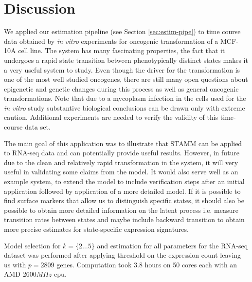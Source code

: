 \section{Discussion}
\label{sec:discussion-onco}

We applied our estimation pipeline (see Section \ref{sec:estim-pipe}) to time course data obtained by {\it in vitro} experiments for oncogenic transformation of a MCF-10A cell line. The system has many fascinating properties, the fact that it undergoes a rapid state transition between phenotypically distinct states makes it a very useful system to study. Even though the driver for the transformation is one of the most well studied oncogenes, there are still many open questions about epigenetic and genetic changes  during this process as well as general oncogenic transformations. Note that due to a mycoplasm infection in  the cells used for the {\it in vitro} study substantive  biological conclusions can be drawn only with extreme caution. Additional experiments are needed to verify the validity of this time-course data set.

The main goal of this application was to illustrate that STAMM can be applied to RNA-seq data and can potentially provide useful results. However, in future due to the clean and relatively rapid transformation in the system, it will very useful in validating some claims from the model. It would also serve well as an example system, to extend the model to include verification steps after an initial application followed by application of a more detailed model. If it is possible to find surface markers that allow us to distinguish specific states, it should also be possible to obtain more detailed information on the latent process i.e. measure transition rates between states and maybe include backward transition to obtain more precise estimates for state-specific expression signatures.


Model selection for $k = \lbrace 2 \ldots 5 \rbrace$ and estimation for all parameters for the RNA-seq dataset was performed after applying threshold on the expression count leaving us with $p=2809$ genes. Computation took $3.8$ hours on 50 cores each with an AMD $2600MHz$ cpu.



